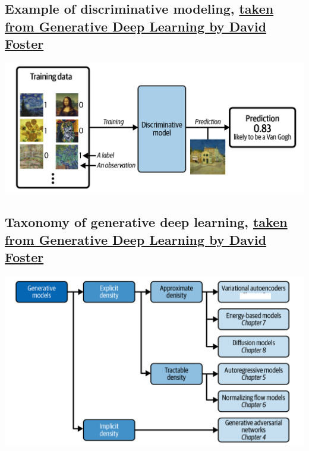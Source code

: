 \documentclass[%
oneside,                 %
final,                   %
10pt]{article}
\begin{document}
\vspace{6mm}

\subsection{Example of discriminative modeling, \href{{https://www.oreilly.com/library/view/generative-deep-learning/9781098134174/ch01.html}}{taken from Generative Deep Learning by David Foster}}

\vspace{6mm}

\centerline{\includegraphics[width=1.0\linewidth]{figures/standarddeeplearning.png}}

\vspace{6mm}

\subsection{Taxonomy of generative deep learning, \href{{https://www.oreilly.com/library/view/generative-deep-learning/9781098134174/ch01.html}}{taken from Generative Deep Learning by David Foster}}

\vspace{6mm}

\centerline{\includegraphics[width=1.0\linewidth]{figures/generativemodels.png}}
\end{document}
